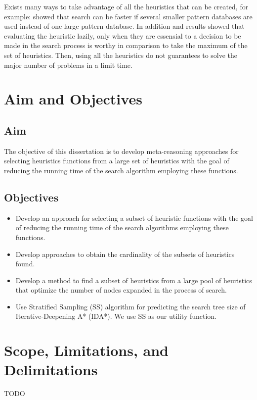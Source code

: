 Exists many ways to take advantage of all the heuristics that can be created, for example: \citep{holte2006maximizing} showed that search can be faster if several smaller pattern databases are used instead of one large pattern database. In addition \citep{domshlak2010max} and \citep{tolpin2013towards} results showed that evaluating the heuristic lazily, only when they are essensial to a decision to be made in the search process is worthy in comparison to take the maximum of the set of heuristics. Then, using all the heuristics do not guarantees to solve the major number of problems in a limit time.

\section{Aim and Objectives}
\subsection{Aim}
\noindent
The objective of this dissertation is to develop meta-reasoning approaches for selecting heuristics functions from a large set of heuristics with the goal of reducing the running time of the search algorithm employing these functions.

\subsection{Objectives}
\noindent

\begin{itemize}
  \item Develop an approach for selecting a subset of heuristic functions with the goal of reducing the running time of the search algorithms employing these functions.
  
  \item Develop approaches to obtain the cardinality of the subsets of heuristics found.
  
  \item Develop a method to find a subset of heuristics from a large pool of heuristics that optimize the number of nodes expanded in the process of search.
  
  \item Use Stratified Sampling (SS) algorithm for predicting the search tree size of Iterative-Deepening A* (IDA*). We use SS as our utility function.
   
\end{itemize}

\section{Scope, Limitations, and Delimitations}
\noindent
TODO
